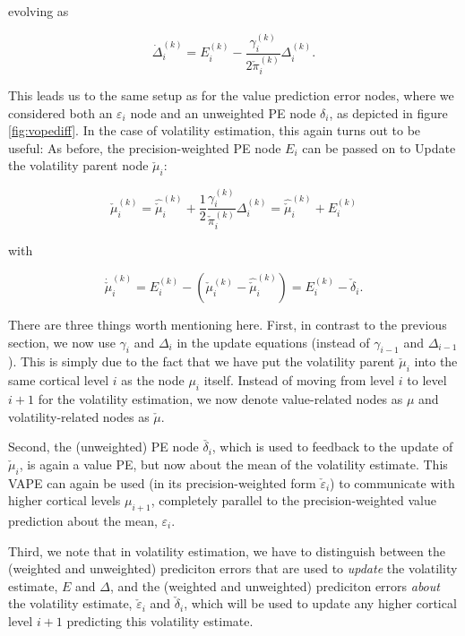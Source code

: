evolving as 

\begin{equation}
	\dot{\Delta}_i^{(k)} = E_i^{(k)} - \frac{\gamma_i^{(k)}}{2 \check{\pi}_i^{(k)}} \Delta_i^{(k)}.
\end{equation}


This leads us to the same setup as for the value prediction error nodes, where we considered both an $\varepsilon_i$ node and an unweighted PE node $\delta_i$, as depicted in figure \ref{fig:vopediff}. In the case of volatility estimation, this again turns out to be useful: As before, the precision-weighted PE node $E_i$ can be passed on to \textsf{Update} the volatility parent node $\check{\mu}_i$:

\begin{equation}
	\check{\mu}_i^{(k)} = \hat{\check{\mu}}_i^{(k)} + \frac{1}{2} \frac{\gamma_i^{(k)}}{\check{\pi}_i^{(k)}} \Delta_i^{(k)} = \hat{\check{\mu}}_i^{(k)} + E_i^{(k)}
\end{equation}

with 

\begin{equation}
	\dot{\check{\mu}}_i^{(k)} = E_i^{(k)} - (\check{\mu}_i^{(k)} - \hat{\check{\mu}}_i^{(k)}) = E_i^{(k)} - \check{\delta}_i.
\end{equation}

There are three things worth mentioning here. First, in contrast to the previous section, we now use $\gamma_i$ and $\Delta_i$ in the update equations (instead of $\gamma_{i-1}$ and $\Delta_{i-1}$). This is simply due to the fact that we have put the volatility parent $\check{\mu}_i$ into the same cortical level $i$ as the node $\mu_i$ itself. Instead of moving from level $i$ to level $i+1$ for the volatility estimation, we now denote value-related nodes as $\mu$ and volatility-related nodes as $\check{\mu}$.

Second, the (unweighted) PE node $\check{\delta_i}$, which is used to feedback to the update of $\check{\mu}_i$, is again a value PE, but now about the mean of the volatility estimate. This \textsf{VAPE} can again be used (in its precision-weighted form $\check{\varepsilon}_i$) to communicate with higher cortical levels $\mu_{i+1}$, completely parallel to the precision-weighted value prediction about the mean, $\varepsilon_i$.

Third, we note that in volatility estimation, we have to distinguish between the (weighted and unweighted) prediciton errors that are used to \textit{update} the volatility estimate, $E$ and $\Delta$, and the (weighted and unweighted) prediciton errors \textit{about} the volatility estimate, $\check{\varepsilon}_i$ and $\check{\delta}_i$, which will be used to update any higher cortical level $i+1$ predicting this volatility estimate. 

